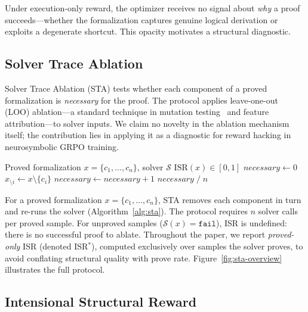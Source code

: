 Under execution-only reward, the optimizer receives no signal about \emph{why} a proof succeeds---whether the formalization captures genuine logical derivation or exploits a degenerate shortcut.
This opacity motivates a structural diagnostic.

\subsection{Solver Trace Ablation}
\label{sec:sta}

Solver Trace Ablation (STA) tests whether each component of a proved formalization is \emph{necessary} for the proof.
The protocol applies leave-one-out (LOO) ablation---a standard technique in mutation testing~\cite{demillo1978, jia-harman-survey} and feature attribution---to solver inputs.
We claim no novelty in the ablation mechanism itself; the contribution lies in applying it as a diagnostic for reward hacking in neurosymbolic GRPO training.

\begin{algorithm}[t]
\caption{Solver Trace Ablation (STA)}
\label{alg:sta}
\begin{algorithmic}[1]
\Require Proved formalization $x = \{c_1, \ldots, c_n\}$, solver $\mathcal{S}$
\Ensure $\text{ISR}(x) \in [0, 1]$
\State $\textit{necessary} \gets 0$
    \State $x_{\setminus i} \gets x \setminus \{c_i\}$
        \State $\textit{necessary} \gets \textit{necessary} + 1$
    \EndIf
\EndFor
\State \Return $\textit{necessary} \;/\; n$
\end{algorithmic}
\end{algorithm}

For a proved formalization $x = \{c_1, \ldots, c_n\}$, STA removes each component in turn and re-runs the solver (Algorithm~\ref{alg:sta}).
The protocol requires $n$ solver calls per proved sample.
For unproved samples ($\mathcal{S}(x) = \texttt{fail}$), ISR is undefined: there is no successful proof to ablate.
Throughout the paper, we report \emph{proved-only} ISR (denoted ISR$^*$), computed exclusively over samples the solver proves, to avoid conflating structural quality with prove rate.
Figure~\ref{fig:sta-overview} illustrates the full protocol.

\subsection{Intensional Structural Reward}
\label{sec:isr}

